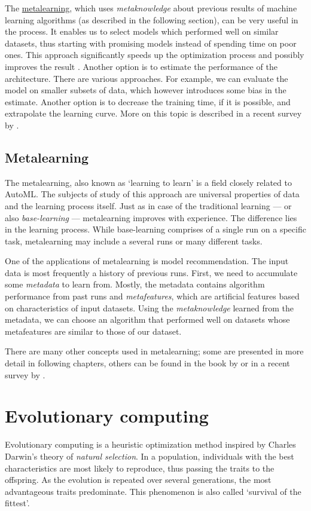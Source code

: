The \hyperref[metalearning]{metalearning}, which uses \emph{metaknowledge}
about previous results of machine learning algorithms (as described in the
following section), can be very useful in the process. It enables us to
select models which performed well on similar datasets, thus starting with
promising models instead of spending time on poor ones. This approach
significantly speeds up the optimization process and possibly improves the
result \citep{DBLP:journals/corr/abs-1810-03548}.
Another option is to estimate the performance of the architecture. There are
various approaches. For example, we can evaluate the model on smaller subsets of
data, which however introduces some bias in the estimate. Another option is to
decrease the training time, if it is possible, and extrapolate the learning
curve. More on this topic is described in a recent survey by
\cite{2018arXiv180805377E}.

\subsection{Metalearning} \label{metalearning}
The metalearning, also known as `learning to learn' is a field closely related
to AutoML. The subjects of study of this approach are universal properties of 
data and the learning process itself. Just as in case of the traditional
learning --- or also \emph{base-learning} --- metalearning improves with
experience. The difference lies in the learning process. While base-learning
comprises of a single run on a specific task, metalearning may include a
several runs or many different tasks. 

One of the applications of metalearning is model recommendation. The input
data is most frequently a history of previous runs. First, we need to
accumulate some \emph{metadata} to learn from. Mostly, the metadata contains
algorithm performance from past runs and \emph{metafeatures}, which are
artificial features based on characteristics of input datasets. Using the
\emph{metaknowledge} learned from the metadata, we can choose an algorithm that
performed well on datasets whose metafeatures are similar to those of our
dataset.

There are many other concepts used in metalearning; some are presented in more
detail in following chapters, others can be found in the book by
\cite{Brazdil:2008:MAD:1507541} or in a recent survey by
\cite{DBLP:journals/corr/abs-1810-03548}.

\section{Evolutionary computing} \label{ea}
Evolutionary computing is a heuristic optimization method inspired by 
Charles Darwin's theory of \emph{natural selection}. \cite{darwin} In 
a population, individuals with the best characteristics are most likely
to reproduce, thus passing the traits to the offspring. As the 
evolution is repeated over several generations, the most advantageous traits 
predominate. This phenomenon is also called `survival of the fittest'.

